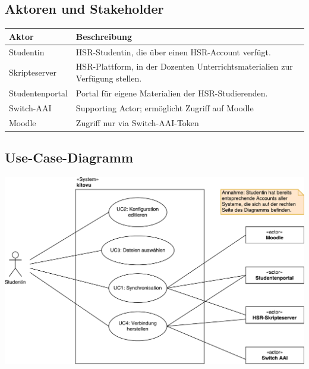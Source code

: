\documentclass[a4paper]{article}
\begin{document}
\pagebreak
\subsection{Aktoren und Stakeholder}

\begin{tabulary}{\linewidth}{lL}
	\toprule
	Aktor & Beschreibung\\
	\midrule
	Studentin & HSR-Studentin, die über einen HSR-Account verfügt.\\
	Skripteserver & HSR-Plattform, in der Dozenten Unterrichtsmaterialien zur Verfügung stellen.\\
	Studentenportal & Portal für eigene Materialien der HSR-Studierenden.\\
	Switch-AAI & Supporting Actor; ermöglicht Zugriff auf Moodle \\	
	Moodle & Zugriff nur via Switch-AAI-Token\\
	
	\bottomrule
\end{tabulary}

\subsection{Use-Case-Diagramm}


\includegraphics[width=40em]{./img/uc_diagram_kitovu.pdf}
\end{document}
